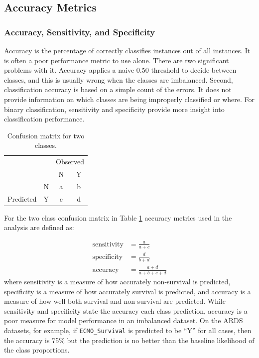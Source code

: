 \documentclass[12pt,]{article}
\begin{document}
\subsection{Accuracy Metrics}\label{accuracy-metrics}

\subsubsection{Accuracy, Sensitivity, and
Specificity}\label{accuracy-sensitivity-and-specificity}

Accuracy is the percentage of correctly classifies instances out of all
instances. It is often a poor performance metric to use alone. There are
two significant problems with it. Accuracy applies a naive 0.50
threshold to decide between classes, and this is usually wrong when the
classes are imbalanced. Second, classification accuracy is based on a
simple count of the errors. It does not provide information on which
classes are being improperly classified or where. For binary
classification, sensitivity and specificity provide more insight into
classification performance.

\begin{table}[!h]

\caption{\label{tab:unnamed-chunk-1}\label{tab:confusion-matrix} Confusion matrix for two classes.}
\centering
\fontsize{12}{14}\selectfont
\begin{tabular}{lc|cc}
\toprule
\multicolumn{2}{c}{ } & \multicolumn{2}{c}{Observed} \\
\cmidrule(l{3pt}r{3pt}){3-4}
  &   & N & Y\\
\midrule
\rowcolor{gray!6}   & N & a & b\\

\multirow{-2}{*}{\raggedright\arraybackslash Predicted} & Y & c & d\\
\bottomrule
\end{tabular}
\end{table}

For the two class confusion matrix in Table \ref{tab:confusion-matrix}
accuracy metrics used in the analysis are defined as:

\[
\begin{aligned}
\text{sensitivity} &= \frac{a}{a+c} \\
\text{specificity} &= \frac{d}{b+d} \\
\text{accuracy} &= \frac{a+d}{a+b+c+d}
\end{aligned}
\] where sensitivity is a measure of how accurately non-survival is
predicted, specificity is a measure of how accurately survival is
predicted, and accuracy is a measure of how well both survival and
non-survival are predicted. While sensitivity and specificity state the
accuracy each class prediction, accuracy is a poor measure for model
performance in an imbalanced dataset. On the ARDS datasets, for example,
if \texttt{ECMO\_Survival} is predicted to be ``Y'' for all cases, then
the accuracy is 75\% but the prediction is no better than the baseline
likelihood of the class proportions.
\end{document}
